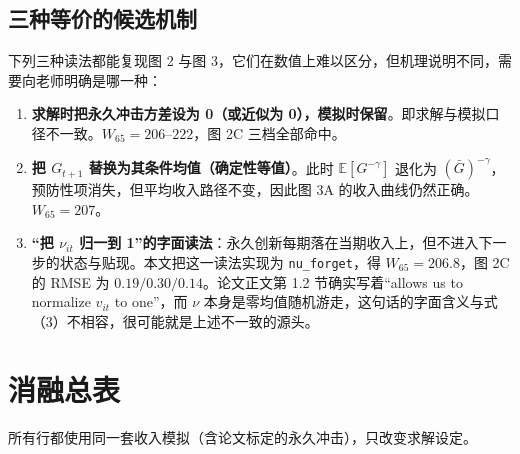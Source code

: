 \documentclass[UTF8,a4paper,11pt,fontset=fandol]{ctexart}
\begin{document}
\subsection{三种等价的候选机制}
下列三种读法都能复现图 2 与图 3，它们在数值上难以区分，但机理说明不同，需要向老师明确是哪一种：
\begin{enumerate}[leftmargin=2.2em,itemsep=2pt]
\item \textbf{求解时把永久冲击方差设为 0（或近似为 0），模拟时保留}。即求解与模拟口径不一致。\(W_{65}=206\text{--}222\)，图 2C 三档全部命中。
\item \textbf{把 \(G_{t+1}\) 替换为其条件均值（确定性等值）}。此时 \(\mathbb{E}[G^{-\gamma}]\) 退化为 \((\bar G)^{-\gamma}\)，预防性项消失，但平均收入路径不变，因此图 3A 的收入曲线仍然正确。\(W_{65}=207\)。
\item \textbf{“把 \(\nu_{it}\) 归一到 1”的字面读法}：永久创新每期落在当期收入上，但不进入下一步的状态与贴现。本文把这一读法实现为 \texttt{nu\_forget}，得 \(W_{65}=206.8\)，图 2C 的 RMSE 为 \(0.19/0.30/0.14\)。论文正文第 1.2 节确实写着“allows us to normalize \(v_{it}\) to one”，而 \(\nu\) 本身是零均值随机游走，这句话的字面含义与式（3）不相容，很可能就是上述不一致的源头。
\end{enumerate}

\section{消融总表}
\label{sec:ablation}
所有行都使用同一套收入模拟（含论文标定的永久冲击），只改变求解设定。
\end{document}
